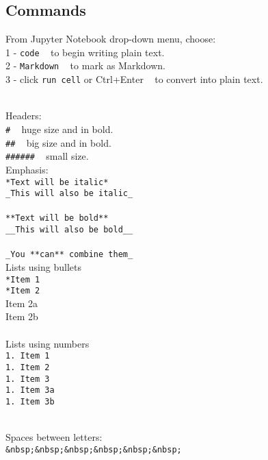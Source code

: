 \documentclass{article}
\begin{document}
{{{\subsection{Commands}
From Jupyter Notebook drop-down menu, choose:\\
1 - \texttt{code} ~ to begin writing plain text.\\
2 - \texttt{Markdown} ~ to mark as Markdown.\\
3 - click \texttt{run cell} or Ctrl+Enter ~ to convert into plain text.\\
\\
\begin{multicols}{2}

Headers:\\
\texttt{\#} ~ huge size and in bold.\\
\texttt{\#\#} ~ big size and in bold.\\
\texttt{\#\#\#\#\#\#} ~ small size.\\

Emphasis:\\
\texttt{*Text will be italic*}\\
\texttt{\_This will also be italic\_}\\
\\
\texttt{**Text will be bold**}\\
\texttt{\_\_This will also be bold\_\_}\\
\\
\texttt{\_You **can** combine them\_}\\
Lists using bullets\\
\texttt{*Item 1}\\
\texttt{*Item 2}\\
\indent * Item 2a\\
\indent * Item 2b\\
\\
Lists using numbers\\
\texttt{1. Item 1}\\
\texttt{1. Item 2}\\
\texttt{1. Item 3}\\
\indent \texttt{1. Item 3a}\\
\indent \texttt{1. Item 3b}\\
\end{multicols}\\

Spaces between letters:\\
\texttt{\&nbsp;\&nbsp;\&nbsp;\&nbsp;\&nbsp;\&nbsp;} \\
\\

}}}
\end{document}
